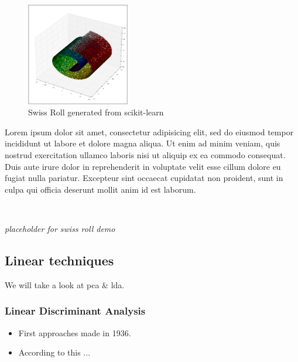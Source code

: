 \begin{figure}
	\centering
	\includegraphics[width=0.4\textwidth]{external_content/graphs/swiss_roll.png}
	\captionsetup{justification=centering}
	\caption{Swiss Roll generated from scikit-learn \cite{scikit-learn}}
    \label{fig:swissrollfull}
\end{figure}

Lorem ipsum dolor sit amet, consectetur adipisicing elit, sed do eiusmod
tempor incididunt ut labore et dolore magna aliqua. Ut enim ad minim veniam,
quis nostrud exercitation ullamco laboris nisi ut aliquip ex ea commodo
consequat. Duis aute irure dolor in reprehenderit in voluptate velit esse
cillum dolore eu fugiat nulla pariatur. Excepteur sint occaecat cupidatat non
proident, sunt in culpa qui officia deserunt mollit anim id est laborum.

\clearpage

\ 

\begin{center}
	\textit{placeholder for swiss roll demo}
\end{center}


\clearpage


\subsection{Linear techniques}

We will take a look at \gls{pca} \& \gls{lda}.



\subsubsection{Linear Discriminant Analysis}

\begin{itemize}
	\item First approaches made in 1936. \cite{fisher1936use}
	\item According to this ...
\end{itemize}

